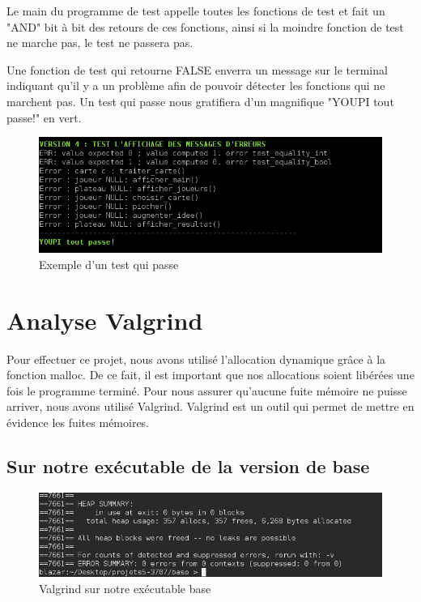 \documentclass[10pt,a4paper]{article}
\begin{document}
Le main du programme de test appelle toutes les fonctions de test et fait un "AND" bit à bit des retours de ces fonctions, ainsi si la moindre fonction de test ne marche pas, le test ne passera pas. 

Une fonction de test qui retourne FALSE enverra un message sur le terminal indiquant qu'il y a un problème afin de pouvoir détecter les fonctions qui ne marchent pas. Un test qui passe nous gratifiera d'un magnifique "YOUPI tout passe!" en vert. 

\begin{figure}[!h]
\centering
\includegraphics[width=\textwidth]{CaptureTest.png}
\caption{\label{fig:v_base}Exemple d'un test qui passe}
\end{figure}

\newpage
\section{Analyse Valgrind}
Pour effectuer ce projet, nous avons utilisé l'allocation dynamique grâce à la fonction malloc. De ce fait, il est important que nos allocations soient libérées une fois le programme terminé. Pour nous assurer qu'aucune fuite mémoire ne puisse arriver, nous avons utilisé Valgrind. Valgrind est un outil qui permet de mettre en évidence les fuites mémoires.
\subsection{Sur notre exécutable de la version de base}
\begin{figure}[!h]
\centering
\includegraphics[width=\textwidth]{valgrind_base.png}
\caption{\label{fig:v_base}Valgrind sur notre exécutable base}
\end{figure}
\end{document}
